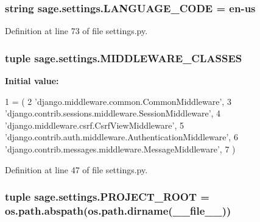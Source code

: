 \subsubsection[{L\+A\+N\+G\+U\+A\+G\+E\+\_\+\+C\+O\+D\+E}]{\setlength{\rightskip}{0pt plus 5cm}string sage.\+settings.\+L\+A\+N\+G\+U\+A\+G\+E\+\_\+\+C\+O\+D\+E = \textquotesingle{}en-\/us\textquotesingle{}}\label{namespacesage_1_1settings_ac5b7a49ef37a25508ecb84453063821a}


Definition at line 73 of file settings.\+py.

\hypertarget{namespacesage_1_1settings_a247a0ea3c79f999897dbfaed3bc99b1d}{}
\subsubsection[{M\+I\+D\+D\+L\+E\+W\+A\+R\+E\+\_\+\+C\+L\+A\+S\+S\+E\+S}]{\setlength{\rightskip}{0pt plus 5cm}tuple sage.\+settings.\+M\+I\+D\+D\+L\+E\+W\+A\+R\+E\+\_\+\+C\+L\+A\+S\+S\+E\+S}\label{namespacesage_1_1settings_a247a0ea3c79f999897dbfaed3bc99b1d}
{\bfseries Initial value\+:}
\begin{DoxyCode}
1 = (
2     \textcolor{stringliteral}{'django.middleware.common.CommonMiddleware'},
3     \textcolor{stringliteral}{'django.contrib.sessions.middleware.SessionMiddleware'},
4     \textcolor{stringliteral}{'django.middleware.csrf.CsrfViewMiddleware'},
5     \textcolor{stringliteral}{'django.contrib.auth.middleware.AuthenticationMiddleware'},
6     \textcolor{stringliteral}{'django.contrib.messages.middleware.MessageMiddleware'},
7 )
\end{DoxyCode}


Definition at line 47 of file settings.\+py.

\hypertarget{namespacesage_1_1settings_ae2e71004e0684c0243b4e9792726cd0f}{}
\subsubsection[{P\+R\+O\+J\+E\+C\+T\+\_\+\+R\+O\+O\+T}]{\setlength{\rightskip}{0pt plus 5cm}tuple sage.\+settings.\+P\+R\+O\+J\+E\+C\+T\+\_\+\+R\+O\+O\+T = os.\+path.\+abspath(os.\+path.\+dirname(\+\_\+\+\_\+file\+\_\+\+\_\+))}\label{namespacesage_1_1settings_ae2e71004e0684c0243b4e9792726cd0f}


